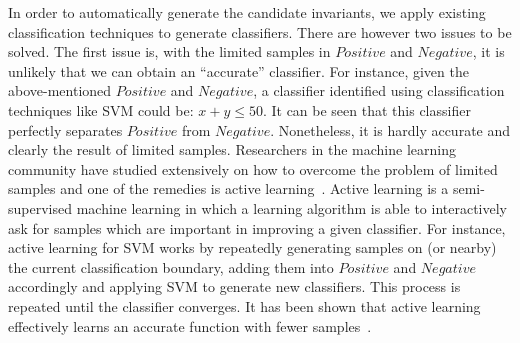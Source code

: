 In order to automatically generate the candidate invariants, we apply existing classification techniques to generate classifiers. There are however two issues to be solved. The first issue is, with the limited samples in $\mathit{Positive}$ and $\mathit{Negative}$, it is unlikely that we can obtain an ``accurate'' classifier. For instance, given the above-mentioned $\mathit{Positive}$ and $\mathit{Negative}$, a classifier identified using classification techniques like SVM could be: $x+y \leq 50$. It can be seen that this classifier perfectly separates $\mathit{Positive}$ from $\mathit{Negative}$. Nonetheless, it is hardly accurate and clearly the result of limited samples. Researchers in the machine learning community have studied extensively on how to overcome the problem of limited samples and one of the remedies is active learning~\cite{active}. Active learning is a semi-supervised machine learning in which a learning algorithm is able to interactively ask for samples which are important in improving a given classifier. For instance, active learning for SVM works by repeatedly generating samples on (or nearby) the current classification boundary, adding them into $\mathit{Positive}$ and $\mathit{Negative}$ accordingly and applying SVM to generate new classifiers. This process is repeated until the classifier converges. It has been shown that active learning effectively learns an accurate function with fewer samples~\cite{DBLP:conf/icml/SchohnC00}.

